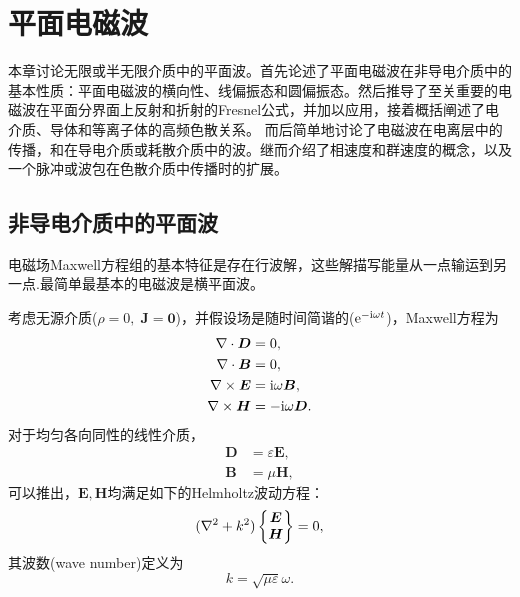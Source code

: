 \chapter{平面电磁波}
\label{chap:plane wave}

本章讨论无限或半无限介质中的平面波。首先论述了平面电磁波在非导电介质中的基本性质：平面电磁波的横向性、线偏振态和圆偏振态。然后推导了至关重要的电磁波在平面分界面上反射和折射的Fresnel公式，并加以应用，接着概括阐述了电介质、导体和等离子体的高频色散关系。%
而后简单地讨论了电磁波在电离层中的传播，和在导电介质或耗散介质中的波。继而介绍了相速度和群速度的概念，以及一个脉冲或波包在色散介质中传播时的扩展。%

\section{非导电介质中的平面波}

电磁场Maxwell方程组的基本特征是存在行波解，这些解描写能量从一点输运到另一点.最简单最基本的电磁波是横平面波。%


考虑无源介质($\rho=0,\;\bm J=\bm 0$)，并假设场是随时间简谐的($\mathop{}\!\mathrm{e}^{-\mathrm{i}\omega t}$)，Maxwell方程为
\begin{subequations}
    \begin{align}
        \nabla\cdot\bm D&=0,\\
        \nabla\cdot\bm B&=0,\\
        \nabla\times\bm E&=\mathrm{i}\omega\bm B,\\
        \nabla\times\bm H&=-\mathrm{i}\omega\bm D. 
    \end{align}
\end{subequations}
对于均匀各向同性的线性介质，
\begin{align*}
    \bm D&=\varepsilon\bm E,\\
    \bm B&=\mu\bm H,
\end{align*}
可以推出，$\bm E,\bm H$均满足如下的Helmholtz波动方程：
\begin{equation}
    (\nabla^2+k^2)\begin{Bmatrix}
        \bm E\\\bm H
    \end{Bmatrix}=0,
\end{equation}
其波数(wave number)定义为
\begin{equation}
    k=\sqrt{\mu\varepsilon}\omega.
\end{equation}

